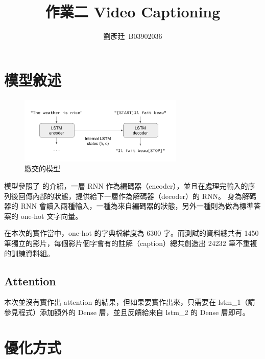 \documentclass[final,3p]{elsarticle}
\begin{document}
\begin{frontmatter}

\title{作業二 Video Captioning}

\author{劉彥廷~B03902036}

\end{frontmatter}


\section{模型敘述}
	\begin{figure}[H]
		\centering
		\includegraphics[width=0.7\textwidth]{images/model}
		\caption{繳交的模型} \label{fig:model}
	\end{figure}
	
	模型參照了 \cite{Atenminu59:online} 的介紹，一層 RNN 作為編碼器（encoder），並且在處理完輸入的序列後回傳內部的狀態，提供給下一層作為解碼器（decoder）的 RNN。
	身為解碼器的 RNN 會讀入兩種輸入，一種為來自編碼器的狀態，另外一種則為做為標準答案的 one-hot 文字向量。
	
	在本次的實作當中，one-hot 的字典檔維度為 6300 字。而測試的資料總共有 1450 筆獨立的影片，每個影片個字會有的註解（caption）總共創造出 24232 筆不重複的訓練資料組。
	
	\subsection{Attention}
	本次並沒有實作出 attention 的結果，但如果要實作出來，只需要在 lstm_1（請參見程式）添加額外的 Dense 層，並且反饋給來自 lstm_2 的 Dense 層即可。
			
\section{優化方式}
\end{document}
